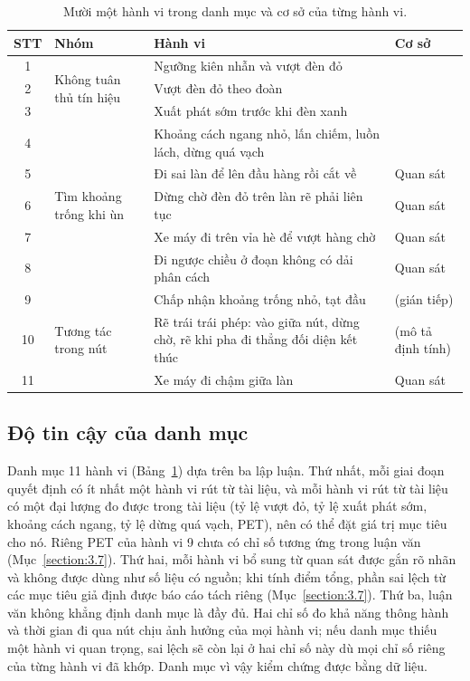 \documentclass[../main.tex]{subfiles}
\begin{document}
\begin{table}[!htbp]
\centering
\small
\caption{Mười một hành vi trong danh mục và cơ sở của từng hành vi.}
\label{table:1.1}
\begin{tabular}{|c|p{2.6cm}|p{5.2cm}|p{4.6cm}|}
\hline
\textbf{STT} & \textbf{Nhóm} & \textbf{Hành vi} & \textbf{Cơ sở} \\
\hline
1 & \multirow{3}{2.6cm}{Không tuân thủ tín hiệu} & Ngưỡng kiên nhẫn và vượt đèn đỏ & \cite{mai2019signal,saval2023mixed} \\
2 & & Vượt đèn đỏ theo đoàn & \cite{phuengprachuab2023opportunistic,gao2020redlight} \\
3 & & Xuất phát sớm trước khi đèn xanh & \cite{mai2019signal,phuengprachuab2023opportunistic} \\
\hline
4 & \multirow{5}{2.6cm}{Tìm khoảng trống khi ùn} & Khoảng cách ngang nhỏ, lấn chiếm, luồn lách, dừng quá vạch & \cite{chu2005speed,zulkiffli2023stopping,torquato2020motorcycles} \\
5 & & Đi sai làn để lên đầu hàng rồi cắt về & Quan sát \\
6 & & Dừng chờ đèn đỏ trên làn rẽ phải liên tục & Quan sát \\
7 & & Xe máy đi trên vỉa hè để vượt hàng chờ & Quan sát \\
8 & & Đi ngược chiều ở đoạn không có dải phân cách & Quan sát \\
\hline
9 & \multirow{3}{2.6cm}{Tương tác trong nút} & Chấp nhận khoảng trống nhỏ, tạt đầu & \cite{hsu2024v2x} (gián tiếp) \\
10 & & Rẽ trái trái phép: vào giữa nút, dừng chờ, rẽ khi pha đi thẳng đối diện kết thúc & \cite{mai2019signal} (mô tả định tính) \\
11 & & Xe máy đi chậm giữa làn & Quan sát \\
\hline
\end{tabular}
\end{table}

\subsection{Độ tin cậy của danh mục}

Danh mục 11 hành vi (Bảng~\ref{table:1.1}) dựa trên ba lập luận. Thứ nhất, mỗi giai đoạn quyết định có ít nhất một hành vi rút từ tài liệu, và mỗi hành vi rút từ tài liệu có một đại lượng đo được trong tài liệu (tỷ lệ vượt đỏ, tỷ lệ xuất phát sớm, khoảng cách ngang, tỷ lệ dừng quá vạch, PET), nên có thể đặt giá trị mục tiêu cho nó. Riêng PET của hành vi 9 chưa có chỉ số tương ứng trong luận văn (Mục~\ref{section:3.7}). Thứ hai, mỗi hành vi bổ sung từ quan sát được gắn rõ nhãn và không được dùng như số liệu có nguồn; khi tính điểm tổng, phần sai lệch từ các mục tiêu giả định được báo cáo tách riêng (Mục~\ref{section:3.7}). Thứ ba, luận văn không khẳng định danh mục là đầy đủ. Hai chỉ số đo khả năng thông hành và thời gian đi qua nút chịu ảnh hưởng của mọi hành vi; nếu danh mục thiếu một hành vi quan trọng, sai lệch sẽ còn lại ở hai chỉ số này dù mọi chỉ số riêng của từng hành vi đã khớp. Danh mục vì vậy kiểm chứng được bằng dữ liệu.
\end{document}
